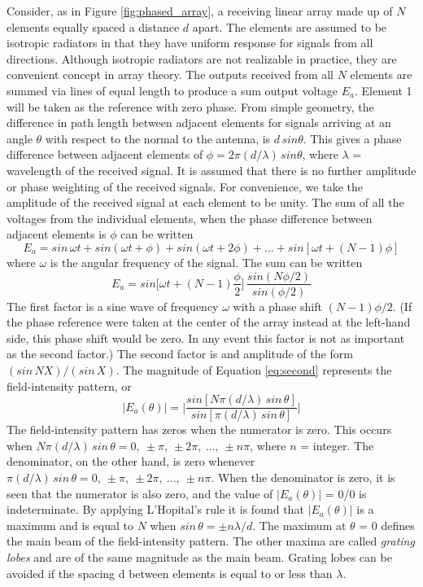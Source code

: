\documentclass{article}
\begin{document}
Consider, as in Figure \ref{fig:phased_array}, a receiving linear array made up of $N$ elements equally spaced a distance $d$ apart. The elements are assumed to be isotropic radiators in that they have uniform response for signals from all directions. Although isotropic radiators are not realizable in practice, they are convenient concept in array theory. The outputs received from all $N$ elements are summed via lines of equal length to produce a sum output voltage $E_a$. Element 1 will be taken as the reference with zero phase. From simple geometry, the difference in path length between adjacent elements for signals arriving at an angle $\theta$ with respect to the normal to the antenna, is $d\,sin\theta$. This gives a phase difference between adjacent elements of $\phi=2\pi(d/\lambda)\,sin\theta$, where $\lambda$ = wavelength of the received signal. It is assumed that there is no further amplitude or phase weighting of the received signals. For convenience, we take the amplitude of the received signal at each element to be unity. The sum of all the voltages from the individual elements, when the phase difference between adjacent elements is $\phi$ can be written
\begin{equation}
\label{eq:first}
E_a=sin\,\omega t+sin(\omega t + \phi)+sin(\omega t + 2\phi)+...+sin[\omega t +(N-1)\phi] 
\end{equation}
where $\omega$ is the angular frequency of the signal. The sum can be written
\begin{equation}
\label{eq:second}
E_a=sin\bigg[\omega t + (N-1)\frac{\phi}{2}\bigg]\,\frac{sin(N\phi/2)}{sin(\phi/2)}
\end{equation}
The first factor is a sine wave of frequency $\omega$ with a phase shift $(N-1)\phi/2$. (If the phase reference were taken at the center of the array instead at the left-hand side, this phase shift would be zero. In any event this factor is not as important as the second factor.) The second factor is and amplitude of the form $(sin\,NX)/(sin\,X)$. The magnitude of Equation \ref{eq:second} represents the field-intensity pattern, or
\begin{equation}
\label{eq:second}
|E_a(\theta)|=\bigg|\frac{sin[N\pi(d/\lambda)\,sin\,\theta]}{sin[\pi(d/\lambda)\,sin\,\theta]}\bigg|
\end{equation}
The field-intensity pattern has zeros when the numerator is zero. This occurs when $N\pi(d/\lambda)\,sin\,\theta=0,\:\pm\pi,\:\pm 2\pi,\:...,\:\pm n\pi$, where $n$ = integer. The denominator, on the other hand, is zero whenever $\pi(d/\lambda)\,sin\,\theta=0,\:\pm\pi,\:\pm 2\pi,\:...,\:\pm n\pi$. When the denominator is zero, it is seen that the numerator is also zero, and the value of $|E_a(\theta)|$ = 0/0 is indeterminate. By applying L'Hopital's rule it is found that $|E_a(\theta)|$ is a maximum and is equal to $N$ when $sin\,\theta=\pm n\lambda/d$. The maximum at $\theta$ = 0 defines the main beam of the field-intensity pattern. The other maxima are called \emph{grating lobes} and are of the same magnitude as the main beam. Grating lobes can be avoided if the spacing d between elements is equal to or less than $\lambda$. \cite{Skolnik:2001irs}
\end{document}
